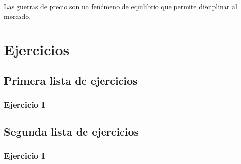 \documentclass[letterpaper,12pt,twocolumn]{report}
\begin{document}
Las guerras de precio son un fenómeno de equilibrio que permite disciplinar al mercado.

\chapter{Ejercicios}

\section{Primera lista de ejercicios}

\subsection*{Ejercicio I}

\section{Segunda lista de ejercicios}

\subsection*{Ejercicio I}
\end{document}
